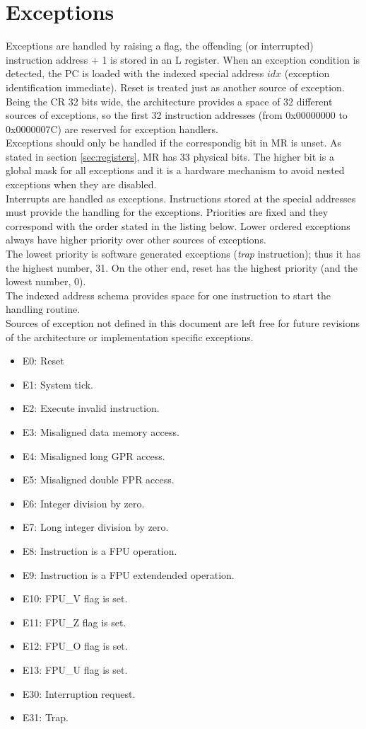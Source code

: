 \section{Exceptions}
\label{sec:exceptions}
Exceptions are handled by raising a flag, the offending (or interrupted) instruction address + 1 is stored in an L register.
When an exception condition is detected, the PC is loaded with the indexed special address $idx$ (exception identification immediate).
Reset is treated just as another source of exception.
Being the CR 32 bits wide, the architecture provides a space of 32 different
sources of exceptions, so the first 32 instruction addresses (from 0x00000000 to 0x0000007C) are reserved for exception handlers.\\
Exceptions should only be handled if the correspondig bit in MR is unset. As stated in section \ref{sec:registers}, MR has 33 physical
bits. The higher bit is a global mask for all exceptions and it is a hardware mechanism to avoid nested exceptions
when they are disabled.\\
Interrupts are handled as exceptions. Instructions stored at the special addresses must provide the handling for the exceptions.
Priorities are fixed and they correspond with the order stated in the listing below. Lower ordered exceptions always have higher priority over other
sources of exceptions.\\
The lowest priority is software generated exceptions (\emph{trap} instruction); thus it has the highest number, 31. On the other end, reset has the highest priority
(and the lowest number, 0).\\
The indexed address schema provides space for one instruction to start the handling routine.\\
Sources of exception not defined in this document are left free for future revisions of the architecture or implementation specific
exceptions.

\begin{itemize}
\item E0: Reset
\item E1: System tick.
\item E2: Execute invalid instruction.
\item E3: Misaligned data memory access.
\item E4: Misaligned long GPR access.
\item E5: Misaligned double FPR access.
\item E6: Integer division by zero.
\item E7: Long integer division by zero.
\item E8: Instruction is a FPU operation.
\item E9: Instruction is a FPU extendended operation.
\item E10: FPU\_V flag is set.
\item E11: FPU\_Z flag is set.
\item E12: FPU\_O flag is set.
\item E13: FPU\_U flag is set.
\item E30: Interruption request.
\item E31: Trap.
\end{itemize}


